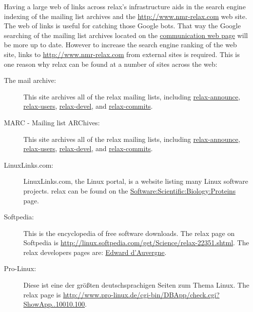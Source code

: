 Having a large web of links across relax's infrastructure aids in the search engine indexing of the mailing list archives and the \href{http://www.nmr-relax.com}{http://www.nmr-relax.com} web site.
The web of links is useful for catching those Google bots.
That way the Google searching of the mailing list archives located on the \href{http://www.nmr-relax.com/communication.html}{communication web page} will be more up to date.
However to increase the search engine ranking of the web site, links to \href{http://www.nmr-relax.com}{http://www.nmr-relax.com} from external sites is required.
This is one reason why relax can be found at a number of sites across the web:
\begin{description}
  \item[The mail archive:]  This site archives all of the relax mailing lists, including \href{http://mail-archive.com/relax-announce@gna.org/}{relax-announce}, \href{http://mail-archive.com/relax-users@gna.org/}{relax-users}, \href{http://mail-archive.com/relax-devel@gna.org/}{relax-devel}, and \href{http://mail-archive.com/relax-commits@gna.org/}{relax-commits}.
  \item[MARC -  Mailing list ARChives:]  This site archives all of the relax mailing lists, including \href{http://marc.info/?l=relax-announce&r=1&w=2}{relax-announce}, \href{http://marc.info/?l=relax-users&r=1&w=2}{relax-users}, \href{http://marc.info/?l=relax-devel&r=1&w=2}{relax-devel}, and \href{http://marc.info/?l=relax-commits&r=1&w=2}{relax-commits}.
  \item[LinuxLinks.com:]  LinuxLinks.com, the Linux portal, is a website listing many Linux software projects.
    relax can be found on the \href{http://linuxlinks.com/Software/Scientific/Biology/Proteins/}{Software:\-Scientific:\-Biology:\-Proteins} page.
  \item[Softpedia:]  This is the encyclopedia of free software downloads.
    The relax page on Softpedia is \href{http://linux.softpedia.com/get/Science/relax-22351.shtml}{http://linux.softpedia.com/get/Science/relax-22351.shtml}.
    The relax developers pages are:  \href{http://linux.softpedia.com/developer/Edward-d-039-Auvergne-5136.html}{Edward d'Auvergne}.
  \item[Pro-Linux:]  Diese ist eine der gr\"o{\ss}ten deutschsprachigen Seiten zum Thema Linux.
    The relax page is \href{http://www.pro-linux.de/cgi-bin/DBApp/check.cgi?ShowApp..10010.100}{http://\-www.\-pro\--linux.\-de/\-cgi\--bin/\-DB\-App/\-check\-.cgi\-?ShowApp..10010.100}.
\end{description}
